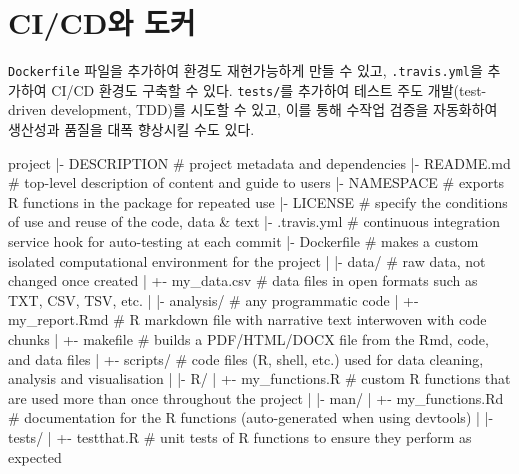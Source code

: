 \documentclass[
  letterpaper,
  chapter,a4paper,showtrims,openright,hidelinks]{oblivoir}
\newenvironment{Shaded}{\begin{snugshade}}{\end{snugshade}}
\newcommand{\CommentTok}[1]{\textcolor[rgb]{0.37,0.37,0.37}{#1}}
\newcommand{\ExtensionTok}[1]{\textcolor[rgb]{0.00,0.23,0.31}{#1}}
\newcommand{\KeywordTok}[1]{\textcolor[rgb]{0.00,0.23,0.31}{#1}}
\newcommand{\NormalTok}[1]{\textcolor[rgb]{0.00,0.23,0.31}{#1}}
\begin{document}
\hypertarget{cicd-docker}{%
\section{CI/CD와 도커}\label{cicd-docker}}

\texttt{Dockerfile} 파일을 추가하여 환경도 재현가능하게 만들 수 있고,
\texttt{.travis.yml}을 추가하여 CI/CD 환경도 구축할 수 있다.
\texttt{tests/}를 추가하여 테스트 주도 개발(test-driven development,
TDD)를 시도할 수 있고, 이를 통해 수작업 검증을 자동화하여 생산성과
품질을 대폭 향상시킬 수도 있다.

\begin{Shaded}
\begin{Highlighting}[]
\ExtensionTok{project}
\KeywordTok{|}\ExtensionTok{{-}}\NormalTok{ DESCRIPTION          }\CommentTok{\# project metadata and dependencies }
\KeywordTok{|}\ExtensionTok{{-}}\NormalTok{ README.md            }\CommentTok{\# top{-}level description of content and guide to users}
\KeywordTok{|}\ExtensionTok{{-}}\NormalTok{ NAMESPACE            }\CommentTok{\# exports R functions in the package for repeated use}
\KeywordTok{|}\ExtensionTok{{-}}\NormalTok{ LICENSE              }\CommentTok{\# specify the conditions of use and reuse of the code, data \& text}
\KeywordTok{|}\ExtensionTok{{-}}\NormalTok{ .travis.yml          }\CommentTok{\# continuous integration service hook for auto{-}testing at each commit}
\KeywordTok{|}\ExtensionTok{{-}}\NormalTok{ Dockerfile           }\CommentTok{\# makes a custom isolated computational environment for the project}
\KeywordTok{|}
\KeywordTok{|}\ExtensionTok{{-}}\NormalTok{ data/                }\CommentTok{\# raw data, not changed once created}
\KeywordTok{|}  \ExtensionTok{+{-}}\NormalTok{ my\_data.csv       }\CommentTok{\# data files in open formats such as TXT, CSV, TSV, etc.}
\KeywordTok{|}
\KeywordTok{|}\ExtensionTok{{-}}\NormalTok{ analysis/            }\CommentTok{\# any programmatic code}
\KeywordTok{|}  \ExtensionTok{+{-}}\NormalTok{ my\_report.Rmd     }\CommentTok{\# R markdown file with narrative text interwoven with code chunks }
\KeywordTok{|}  \ExtensionTok{+{-}}\NormalTok{ makefile          }\CommentTok{\# builds a PDF/HTML/DOCX file from the Rmd, code, and data files}
\KeywordTok{|}  \ExtensionTok{+{-}}\NormalTok{ scripts/          }\CommentTok{\# code files (R, shell, etc.) used for data cleaning, analysis and visualisation }
\KeywordTok{|}
\KeywordTok{|}\ExtensionTok{{-}}\NormalTok{ R/                     }
\KeywordTok{|}  \ExtensionTok{+{-}}\NormalTok{ my\_functions.R    }\CommentTok{\# custom R functions that are used more than once throughout the project}
\KeywordTok{|}
\KeywordTok{|}\ExtensionTok{{-}}\NormalTok{ man/}
\KeywordTok{|}  \ExtensionTok{+{-}}\NormalTok{ my\_functions.Rd   }\CommentTok{\# documentation for the R functions (auto{-}generated when using devtools)}
\KeywordTok{|}
\KeywordTok{|}\ExtensionTok{{-}}\NormalTok{ tests/}
\KeywordTok{|}  \ExtensionTok{+{-}}\NormalTok{ testthat.R        }\CommentTok{\# unit tests of R functions to ensure they perform as expected}
\end{Highlighting}
\end{Shaded}
\end{document}
